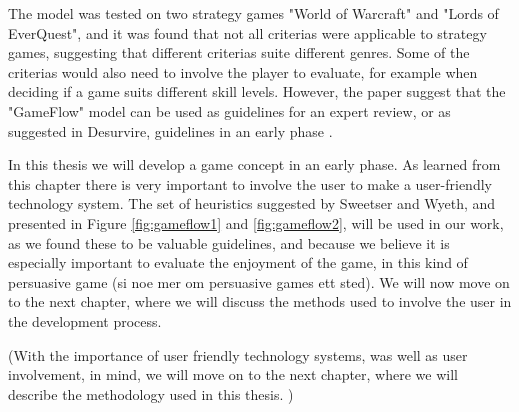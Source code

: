 The model was tested on two strategy games "World of Warcraft" and "Lords of EverQuest", and it was found that not all criterias were applicable to strategy games, suggesting that different criterias suite different genres. Some of the criterias would also need to involve the player to evaluate, for example when deciding if a game suits different skill levels. However, the paper suggest that the "GameFlow" model can be used as guidelines for an expert review, or as suggested in Desurvire, guidelines in an early phase \cite{sweetser} \cite{desurvire}. 

In this thesis we will develop a game concept in an early phase. As learned from this chapter there is very important to involve the user to make a user-friendly technology system. The set of heuristics suggested by Sweetser and Wyeth, and presented in Figure \ref{fig:gameflow1} and \ref{fig:gameflow2}, will be used in our work, as we found these to be valuable guidelines, and because we believe it is especially important to evaluate the enjoyment of the game, in this kind of persuasive game (si noe mer om persuasive games ett sted).  We will now move on to the next chapter, where we will discuss the methods used to involve the user in the development process.

(With the importance of user friendly technology systems, was well as user involvement, in mind, we will move on to the next chapter, where we will describe the methodology used in this thesis. )